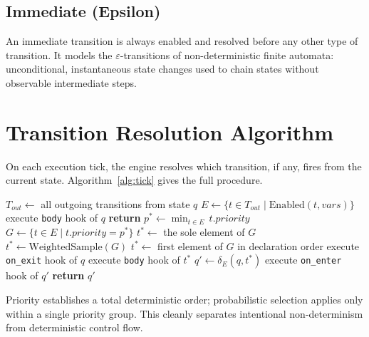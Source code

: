 \subsection{Immediate (Epsilon)}

An immediate transition is always enabled and resolved before any other type of transition. It models the $\varepsilon$-transitions of non-deterministic finite automata: unconditional, instantaneous state changes used to chain states without observable intermediate steps.

\section{Transition Resolution Algorithm}
\label{sec:resolution}

On each execution tick, the engine resolves which transition, if any, fires from the current state. Algorithm~\ref{alg:tick} gives the full procedure.

\begin{algorithm}[H]
  \caption{Transition resolution on a single execution tick.}
  \label{alg:tick}
  \begin{algorithmic}[1]
      \State $T_\mathit{out} \gets$ all outgoing transitions from state $q$
      \State $E \gets \{ t \in T_\mathit{out} \mid \mathrm{Enabled}(t, \mathit{vars}) \}$
        \State execute \texttt{body} hook of $q$
        \State \textbf{return}
      \EndIf
      \State $p^* \gets \min_{t \in E}\, t.\mathit{priority}$
      \State $G \gets \{ t \in E \mid t.\mathit{priority} = p^* \}$
        \State $t^* \gets$ the sole element of $G$
        \State $t^* \gets \mathrm{WeightedSample}(G)$
      \Else
        \State $t^* \gets$ first element of $G$ in declaration order
      \EndIf
      \State execute \texttt{on\_exit} hook of $q$
      \State execute \texttt{body} hook of $t^*$
      \State $q' \gets \delta_E(q, t^*)$
      \State execute \texttt{on\_enter} hook of $q'$
      \State \textbf{return} $q'$
    \EndProcedure
  \end{algorithmic}
\end{algorithm}

Priority establishes a total deterministic order; probabilistic selection applies only within a single priority group. This cleanly separates intentional non-determinism from deterministic control flow.

